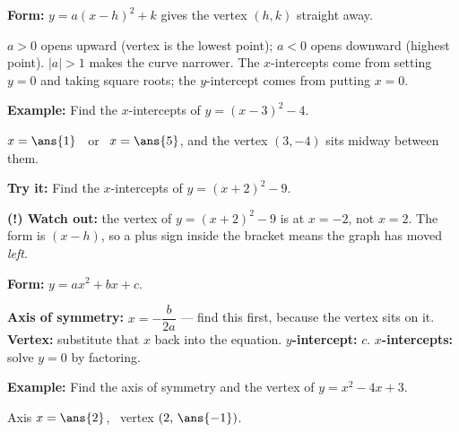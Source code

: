 \documentclass[12pt]{article}
\begin{document}


\begin{formulabox}
\textbf{Form:} \quad $y = a(x-h)^2 + k$ \quad gives the vertex $(h, k)$ straight away.\par\smallskip
$a > 0$ opens upward (vertex is the lowest point); $a < 0$ opens downward (highest point). $|a| > 1$ makes the curve narrower. The $x$-intercepts come from setting $y = 0$ and taking square roots; the $y$-intercept comes from putting $x = 0$.
\end{formulabox}

\begin{examplebox}
\textbf{Example:} \quad Find the $x$-intercepts of $y = (x-3)^2 - 4$.
\par
$x = \ans{1}$ \ or \ $x = \ans{5}$, and the vertex $(3, -4)$ sits midway between them.
\end{examplebox}

\begin{tryitbox}
\textbf{Try it:} \quad Find the $x$-intercepts of $y = (x+2)^2 - 9$.\\[2pt]
\end{tryitbox}

\begin{watchoutbox}
\textbf{(!) Watch out:} the vertex of $y = (x+2)^2 - 9$ is at $x = -2$, not $x = 2$. The form is $(x-h)$, so a plus sign inside the bracket means the graph has moved \emph{left}.
\end{watchoutbox}


\begin{formulabox}
\textbf{Form:} \quad $y = ax^2 + bx + c$.\par\smallskip
\textbf{Axis of symmetry:} $x = -\dfrac{b}{2a}$ --- find this first, because the vertex sits on it. \textbf{Vertex:} substitute that $x$ back into the equation. \textbf{$y$-intercept:} $c$. \textbf{$x$-intercepts:} solve $y = 0$ by factoring.
\end{formulabox}

\begin{examplebox}
\textbf{Example:} \quad Find the axis of symmetry and the vertex of $y = x^2 - 4x + 3$.
\par
Axis $x = \ans{2}$, \ vertex $(2,\, \ans{-1})$.
\end{examplebox}
\end{document}
